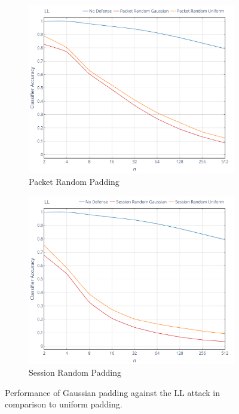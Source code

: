 \documentclass[
	ruledheaders=chapter,
	class=report,
	thesis={type=master, department=inf},
	accentcolor=1c,
	custommargins=true,
	marginpar=false,
	parskip=half-,
	fontsize=11pt,
]{tudapub}
\begin{document}
	\begin{figure}[tbp]
		\begin{subfigure}{0.495\textwidth}
			\centering
			\includegraphics[width=\textwidth]{plots/performance_ll_pkt.png}
			\caption{Packet Random Padding}
		\end{subfigure}
		\hfill
		\begin{subfigure}{0.495\textwidth}
			\centering
			\includegraphics[width=\textwidth]{plots/performance_ll_ses.png}
			\caption{Session Random Padding}
		\end{subfigure}
		\caption[Performance of Gaussian padding against the LL attack]{Performance of Gaussian padding against the LL attack \cite{Liberatore2006} in comparison to uniform padding.}
		\label{fig:ll}
	\end{figure}
\end{document}
